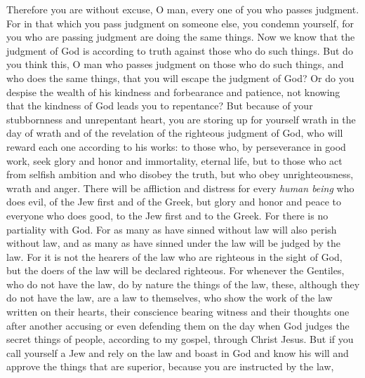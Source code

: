 \begin{biblechapter} %
 Therefore you are without excuse, O man, every one of you who passes judgment. For in that which you pass judgment on someone else, you condemn yourself, for you who are passing judgment are doing the same things.
\verse Now we know that the judgment of God is according to truth against those who do such things.
\verse But do you think this, O man who passes judgment on those who do such things, and who does the same things, that you will escape the judgment of God?
\verse Or do you despise the wealth of his kindness and forbearance and patience, not knowing that the kindness of God leads you to repentance?
\verse But because of your stubbornness and unrepentant heart, you are storing up for yourself wrath in the day of wrath and of the revelation of the righteous judgment of God,
\verse who will reward each one according to his works:
\verse to those who, by perseverance in good work, seek glory and honor and immortality, eternal life,
\verse but to those who act from selfish ambition and who disobey the truth, but who obey unrighteousness, wrath and anger.
\verse There will be affliction and distress for every \textit{human being} who does evil, of the Jew first and of the Greek,
\verse but glory and honor and peace to everyone who does good, to the Jew first and to the Greek.
\verse For there is no partiality with God.
\verse For as many as have sinned without law will also perish without law, and as many as have sinned under the law will be judged by the law.
\verse For it is not the hearers of the law who are righteous in the sight of God, but the doers of the law will be declared righteous.
\verse For whenever the Gentiles, who do not have the law, do by nature the things of the law, these, although they do not have the law, are a law to themselves,
\verse who show the work of the law written on their hearts, their conscience bearing witness and their thoughts one after another accusing or even defending them
\verse on the day when God judges the secret things of people, according to my gospel, through Christ Jesus.
 But if you call yourself a Jew and rely on the law and boast in God
\verse and know his will and approve the things that are superior, because you are instructed by the law,

\end{biblechapter}
